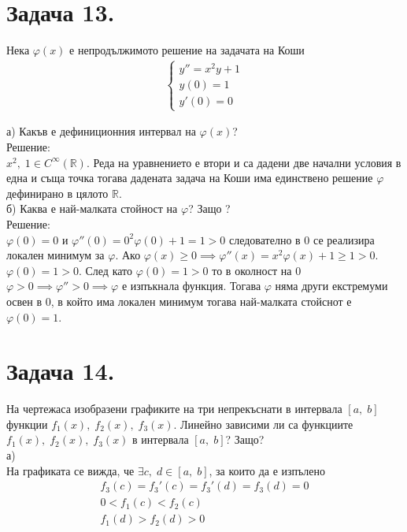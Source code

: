\documentclass[a4paper, 12pt, oneside]{article}
\newcommand{\R}{\mathbb{R}}
\begin{document}
\section{Задача 13.}
Нека $\varphi(x)$ е непродължимото решение на задачата на Коши
\begin{align*}
    \begin{cases}
        y'' = x^2y + 1 \\
        y(0) = 1 \\
        y'(0) = 0
    \end{cases}
\end{align*}

а) Какъв е дефиниционния интервал на $\varphi(x)$? \\

Решение: \\

$x^2, \; 1 \in C^\infty(\R)$. Реда на уравнението е втори
и са дадени две начални условия в една и съща точка тогава
дадената задача на Коши има единствено решение $\varphi$ дефинирано
в цялото $\R$. \\

б) Каква е най-малката стойност на $\varphi$? Защо ? \\

Решение: \\

$\varphi(0) = 0$ и $\varphi''(0) = 0^2\varphi(0) + 1 = 1 > 0$ следователно
в $0$ се реализира локален минимум за $\varphi$. Ако $\varphi(x) \geq 0 \implies \varphi''(x) = x^2\varphi(x) + 1 \geq 1 > 0$.
$\varphi(0) = 1 > 0$. След като $\varphi(0) = 1 > 0$ то в околност на $0$ $\varphi > 0 \implies \varphi'' > 0 \implies \varphi$
е изпъкнала функция. Тогава $\varphi$ няма други екстремуми освен в $0$, в който има локален
минимум тогава най-малката стойснот е $\varphi(0) = 1$.

\section{Задача 14.}

На чертежаса изобразени графиките на три непрекъснати
в интервала $[a, \; b]$ функции $f_1(x), \; f_2(x), \; f_3(x)$.
Линейно зависими ли са функциите $f_1(x), \; f_2(x), \; f_3(x)$
в интервала $[a, \; b]$? Защо? \\

а) \\

На графиката се вижда, че
$\exists c, \; d \in [a, \; b]$, за които да е изпълено
\begin{align*}
    f_3(c) = f_3'(c) = f_3'(d) = f_3(d) = 0 \\
    0 < f_1(c) < f_2(c) \\
    f_1(d) > f_2(d) > 0
\end{align*}
\end{document}
